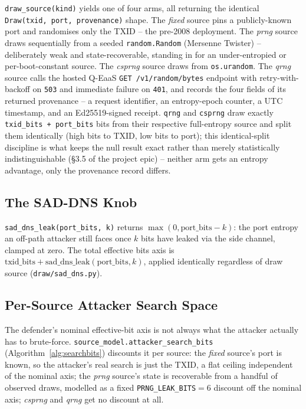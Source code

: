 \documentclass[conference]{IEEEtran}
\begin{document}
\texttt{draw\_source(kind)} yields one of four arms, all returning the identical \texttt{Draw(txid, port,
provenance)} shape. The \emph{fixed} source pins a publicly-known port and randomises only the TXID -- the
pre-2008 deployment. The \emph{prng} source draws sequentially from a seeded \texttt{random.Random}
(Mersenne Twister) -- deliberately weak and state-recoverable, standing in for an under-entropied or
per-boot-constant source. The \emph{csprng} source draws from \texttt{os.urandom}. The \emph{qrng} source
calls the hosted Q-EaaS \texttt{GET /v1/random/bytes} endpoint with retry-with-backoff on \texttt{503}
and immediate failure on \texttt{401}, and records the four fields of its returned provenance -- a request
identifier, an entropy-epoch counter, a UTC timestamp, and an Ed25519-signed receipt. \texttt{qrng} and
\texttt{csprng} draw exactly \texttt{txid\_bits + port\_bits} bits from their respective full-entropy
source and split them identically (high bits to TXID, low bits to port); this identical-split discipline
is what keeps the null result exact rather than merely statistically indistinguishable (\S3.5 of the
project epic) -- neither arm gets an entropy advantage, only the provenance record differs.

\subsection{The SAD-DNS Knob}

\texttt{sad\_dns\_leak(port\_bits, k)} returns $\max(0, \mathrm{port\_bits} - k)$: the port entropy an
off-path attacker still faces once $k$ bits have leaked via the side channel, clamped at zero. The total
effective bits axis is $\mathrm{txid\_bits} + \mathrm{sad\_dns\_leak}(\mathrm{port\_bits}, k)$, applied
identically regardless of draw source (\texttt{draw/sad\_dns.py}).

\subsection{Per-Source Attacker Search Space}
\label{sec:sourcemodel}

The defender's nominal effective-bit axis is not always what the attacker actually has to brute-force.
\texttt{source\_model.attacker\_search\_bits} (Algorithm~\ref{alg:searchbits}) discounts it per source:
the \emph{fixed} source's port is known, so the attacker's real search is just the TXID, a flat ceiling
independent of the nominal axis; the \emph{prng} source's state is recoverable from a handful of observed
draws, modelled as a fixed \texttt{PRNG\_LEAK\_BITS}$=6$ discount off the nominal axis; \emph{csprng} and
\emph{qrng} get no discount at all.
\end{document}
